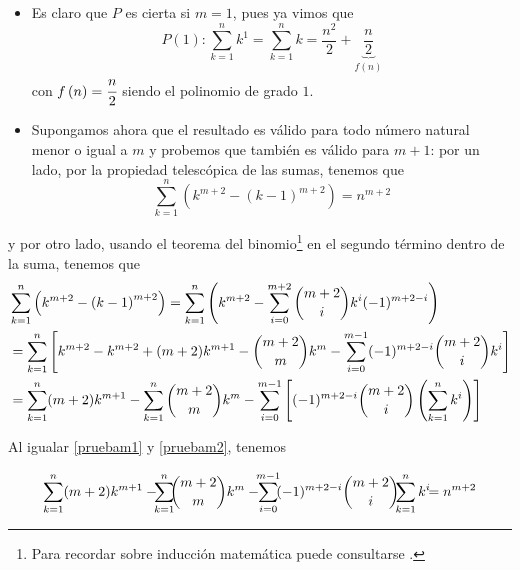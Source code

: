 \begin{itemize}[leftmargin=1.2em,   itemindent=0pt,       labelwidth=,labelsep=0.5em,]


\item Es claro que $P$ es cierta si $m=1$, pues ya vimos que
\[
P\left( 1\right):\sum_{k=1}^{n}k^1=\sum_{k=1}^{n}k=\frac{n^{2}}{2}+\underset{f\left( n\right) }{\underbrace{\frac{n}{2}}}
\]
con $f\left( n\right)=\cfrac{n}{2}$ siendo el polinomio de grado $1$.

\item Supongamos ahora que el resultado es válido para todo número natural menor o igual a $m$ y
probemos que también es válido para $m+1$: por un lado, por la propiedad telescópica de las sumas, tenemos que
\begin{equation}\label{pruebam1}
\sum_{k=1}^{n}\left( k^{m+2}-\left( k-1\right) ^{m+2}\right)=n^{m+2}
\end{equation}
\end{itemize}
y por otro lado, usando el teorema del binomio\footnote{Para recordar sobre inducción matemática puede consultarse \textcite{Stewart_2012}.}
en el segundo término dentro de la suma, tenemos que
{\footnotesize
\begin{align}\label{pruebam2}
&\sum_{k=1}^{n}\left( k^{m+2}-\left( k-1\right)^{m+2}\right)
=\sum_{k=1}^{n}\left( k^{m+2}-\sum_{i=0}^{m+2}\binom{m+2}{i}k^{i}(-1)^{m+2-i}\right)\notag\\
&=\sum_{k=1}^{n}\left[ k^{m+2}-k^{m+2}+(m+2)k^{m+1}-\binom{m+2}{m}k^{m}
-\sum_{i=0}^{m-1}(-1)^{m+2-i}\binom{m+2}{i}k^{i}\right]\notag\\
&=\sum_{k=1}^{n}(m+2)k^{m+1}-\sum_{k=1}^{n}\binom{m+2}{m}k^{m}
-\sum_{i=0}^{m-1}\left[(-1)^{m+2-i}\binom{m+2}{i}\left(\sum_{k=1}^{n}k^{i}\right)\right]
\end{align}
}

Al igualar \eqref{pruebam1} y \eqref{pruebam2}, tenemos

{\small
\[
\sum_{k=1}^{n}(m+2) k^{m+1}-\hspace{-0.15cm}\sum_{k=1}^{n}\hspace{-0.17cm}\binom{m+2}{m}k^{m}
-\hspace{-0.15cm}\sum_{i=0}^{m-1}\hspace{-0.1cm}(-1)^{m+2-i}\binom{m+2}{i}\hspace{-0.15cm}\sum_{k=1}^{n}k^{i} \hspace{-0.15cm}=n^{m+2}
\]
}

